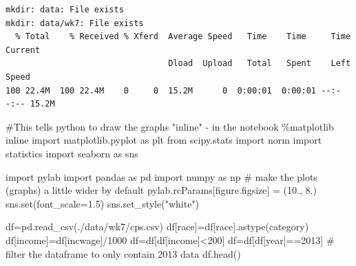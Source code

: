 \documentclass[
  letterpaper,
  DIV=11,
  numbers=noendperiod]{scrreprt}
\newenvironment{Shaded}{\begin{snugshade}}{\end{snugshade}}
\newcommand{\BuiltInTok}[1]{\textcolor[rgb]{0.00,0.23,0.31}{#1}}
\newcommand{\CommentTok}[1]{\textcolor[rgb]{0.37,0.37,0.37}{#1}}
\newcommand{\DecValTok}[1]{\textcolor[rgb]{0.68,0.00,0.00}{#1}}
\newcommand{\FloatTok}[1]{\textcolor[rgb]{0.68,0.00,0.00}{#1}}
\newcommand{\ImportTok}[1]{\textcolor[rgb]{0.00,0.46,0.62}{#1}}
\newcommand{\NormalTok}[1]{\textcolor[rgb]{0.00,0.23,0.31}{#1}}
\newcommand{\OperatorTok}[1]{\textcolor[rgb]{0.37,0.37,0.37}{#1}}
\newcommand{\StringTok}[1]{\textcolor[rgb]{0.13,0.47,0.30}{#1}}
\begin{document}
\begin{verbatim}
mkdir: data: File exists
mkdir: data/wk7: File exists
  % Total    % Received % Xferd  Average Speed   Time    Time     Time  Current
                                 Dload  Upload   Total   Spent    Left  Speed
100 22.4M  100 22.4M    0     0  15.2M      0  0:00:01  0:00:01 --:--:-- 15.2M
\end{verbatim}

\begin{Shaded}
\begin{Highlighting}[]
\CommentTok{\#This tells python to draw the graphs "inline" {-} in the notebook}
\OperatorTok{\%}\NormalTok{matplotlib inline  }
\ImportTok{import}\NormalTok{ matplotlib.pyplot }\ImportTok{as}\NormalTok{ plt}
\ImportTok{from}\NormalTok{ scipy.stats }\ImportTok{import}\NormalTok{ norm}
\ImportTok{import}\NormalTok{ statistics}
\ImportTok{import}\NormalTok{ seaborn }\ImportTok{as}\NormalTok{ sns}

\ImportTok{import}\NormalTok{ pylab}
\ImportTok{import}\NormalTok{ pandas }\ImportTok{as}\NormalTok{ pd}
\ImportTok{import}\NormalTok{ numpy }\ImportTok{as}\NormalTok{ np}
\CommentTok{\# make the plots (graphs) a little wider by default}
\NormalTok{pylab.rcParams[}\StringTok{\textquotesingle{}figure.figsize\textquotesingle{}}\NormalTok{] }\OperatorTok{=}\NormalTok{ (}\FloatTok{10.}\NormalTok{, }\FloatTok{8.}\NormalTok{)}
\NormalTok{sns.}\BuiltInTok{set}\NormalTok{(font\_scale}\OperatorTok{=}\FloatTok{1.5}\NormalTok{)}
\NormalTok{sns.set\_style(}\StringTok{"white"}\NormalTok{)}
\end{Highlighting}
\end{Shaded}

\begin{Shaded}
\begin{Highlighting}[]
\NormalTok{df}\OperatorTok{=}\NormalTok{pd.read\_csv(}\StringTok{\textquotesingle{}./data/wk7/cps.csv\textquotesingle{}}\NormalTok{)}
\NormalTok{df[}\StringTok{\textquotesingle{}race\textquotesingle{}}\NormalTok{]}\OperatorTok{=}\NormalTok{df[}\StringTok{\textquotesingle{}race\textquotesingle{}}\NormalTok{].astype(}\StringTok{\textquotesingle{}category\textquotesingle{}}\NormalTok{)}
\NormalTok{df[}\StringTok{\textquotesingle{}income\textquotesingle{}}\NormalTok{]}\OperatorTok{=}\NormalTok{df[}\StringTok{\textquotesingle{}incwage\textquotesingle{}}\NormalTok{]}\OperatorTok{/}\DecValTok{1000}
\NormalTok{df}\OperatorTok{=}\NormalTok{df[df[}\StringTok{\textquotesingle{}income\textquotesingle{}}\NormalTok{]}\OperatorTok{\textless{}}\DecValTok{200}\NormalTok{]}
\NormalTok{df}\OperatorTok{=}\NormalTok{df[df[}\StringTok{\textquotesingle{}year\textquotesingle{}}\NormalTok{]}\OperatorTok{==}\DecValTok{2013}\NormalTok{] }\CommentTok{\# filter the dataframe to only contain 2013 data}
\NormalTok{df.head()}
\end{Highlighting}
\end{Shaded}
\end{document}
